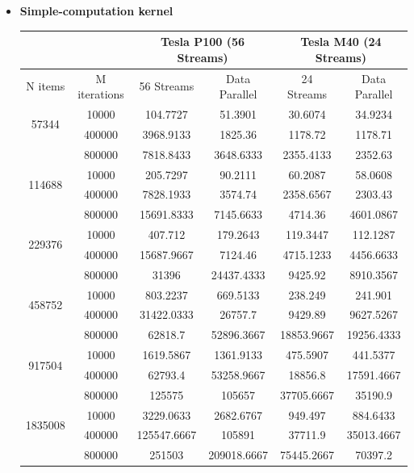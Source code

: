 \begin{itemize}
	\item \textbf{Simple-computation kernel}\\%
		
	\begin{table}
		\centering
		\begin{tabular}{ | c  c || c | c  || c | c || } 
			\hline
			& &  \multicolumn{2}{c}{\textbf{Tesla P100 (56 Streams)}}& \multicolumn{2}{c}{\textbf{Tesla M40 (24 Streams)}} \\ [0.5ex]
			\hline		
			N items &	M iterations &	56 Streams & Data Parallel &	24 Streams & Data Parallel\\
			\hline	\hline	
			
			\multirow{2}{*}{57344}&	10000&	104.7727&	51.3901&	30.6074&	34.9234\\
			&	400000&	3968.9133&	1825.36&	1178.72&	1178.71\\
			&	800000&	7818.8433&	3648.6333&	2355.4133&	2352.63\\
			\hline
			\multirow{2}{*}{114688}&	10000&	205.7297&	90.2111&	60.2087&	58.0608\\
			&	400000&	7828.1933&	3574.74&	2358.6567&	2303.43\\
			&	800000&	15691.8333&	7145.6633&	4714.36&	4601.0867\\
			\hline
			\multirow{2}{*}{229376}&	10000&	407.712&	179.2643&	119.3447&	112.1287\\
			&	400000&	15687.9667&	7124.46&	4715.1233&	4456.6633\\
			&	800000&	31396&	24437.4333&	9425.92&	8910.3567\\
			\hline
			\multirow{2}{*}{458752}&	10000&	803.2237&	669.5133&	238.249&	241.901\\
			&	400000&	31422.0333&	26757.7&	9429.89&	9627.5267\\
			&	800000&	62818.7&	52896.3667&	18853.9667&	19256.4333\\
			\hline
			\multirow{2}{*}{917504}&	10000&	1619.5867&	1361.9133&	475.5907&	441.5377\\
			&	400000&	62793.4&	53258.9667&	18856.8&	17591.4667\\
			&	800000&	125575&	105657&	37705.6667&	35190.9\\
			\hline
			\multirow{2}{*}{1835008}&	10000&	3229.0633&	2682.6767&	949.497&	884.6433\\
			&	400000&	125547.6667&	105891&	37711.9&	35013.4667\\
			&	800000&	251503&	209018.6667&	75445.2667&	70397.2\\


\end{tabular}
\end{table}
\end{itemize}
